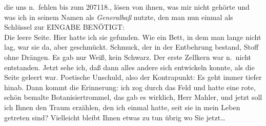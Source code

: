 \documentclass[
]{article}
\begin{document}
die uns n.~fehlen bis zum 207118., lösen von ihnen, was mir nicht
gehörte und was ich in seinem Namen als \emph{Generalbaß} nutzte, den
man nun einmal als Schlüssel zur EINGABE BENÖTIGT:\\
Die leere Seite. Hier hatte ich sie gefunden. Wie ein Bett, in dem man
lange nicht lag, war sie da, aber geschmückt. Schmuck, der in der
Entbehrung bestand, Stoff ohne Drängen. Es gab nur Weiß, kein Schwarz.
Der erste Zellkern war n.~nicht entstanden. Jetzt sehe ich, daß dann
alles andere sich entwickeln konnte, als die Seite geleert war.
Poetische Unschuld, also der Kontrapunkt: Es geht immer tiefer hinab.
Dann kommt die Erinnerung: ich zog durch das Feld und hatte eine rote,
schön bemalte Botanisiertrommel, das gab es wirklich, Herr Mahler, und
jetzt soll ich Ihnen den Traum erzählen, den ich einmal hatte, seit sie
in mein Leben getreten sind? Vielleicht bleibt Ihnen etwas zu tun übrig
wo Sie jetzt\ldots{}
\end{document}
